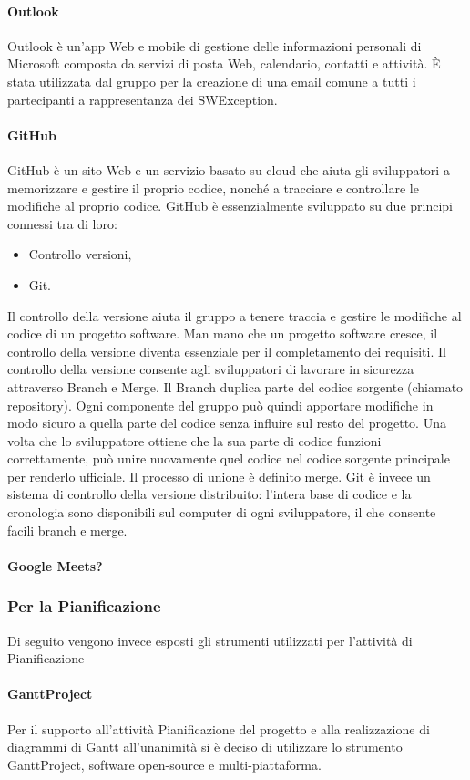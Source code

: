 \paragraph{Outlook}
Outlook è un'app Web e mobile di gestione delle informazioni personali di Microsoft composta da servizi di posta Web, calendario, contatti e attività. È stata utilizzata dal gruppo per la creazione di una email comune a tutti i partecipanti a rappresentanza dei SWException.

\paragraph{GitHub}
GitHub è un sito Web e un servizio basato su cloud che aiuta gli sviluppatori a memorizzare e gestire il proprio codice, nonché a tracciare e controllare le modifiche al proprio codice. GitHub è essenzialmente sviluppato su due principi connessi tra di loro:
\begin{itemize}
    \item Controllo versioni,
    \item Git.
\end{itemize}
Il controllo della versione aiuta il gruppo a tenere traccia e gestire le modifiche al codice di un progetto software. Man mano che un progetto software cresce, il controllo della versione diventa essenziale per il completamento dei requisiti. Il controllo della versione consente agli sviluppatori di lavorare in sicurezza attraverso Branch e Merge. Il Branch duplica parte del codice sorgente (chiamato repository). Ogni componente del gruppo può quindi apportare modifiche in modo sicuro a quella parte del codice senza influire sul resto del progetto. Una volta che lo sviluppatore ottiene che la sua parte di codice funzioni correttamente, può unire nuovamente quel codice nel codice sorgente principale per renderlo ufficiale. Il processo di unione è definito merge.
Git è invece un sistema di controllo della versione distribuito: l'intera base di codice e la cronologia sono disponibili sul computer di ogni sviluppatore, il che consente facili branch e merge.

\paragraph{Google Meets?}

\subsubsection{Per la Pianificazione}
Di seguito vengono invece esposti gli strumenti utilizzati per l’attività di Pianificazione
\paragraph{GanttProject}
Per il supporto all’attività Pianificazione del progetto e alla realizzazione di diagrammi di Gantt all’unanimità si è deciso di utilizzare lo strumento GanttProject, software open-source e multi-piattaforma.

